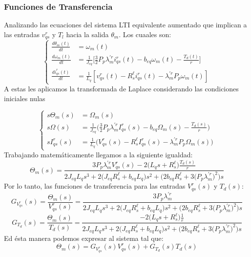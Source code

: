 \documentclass[blue,fullpaper]{ludusofficial}  %
\begin{document}
\subsubsection{Funciones de Transferencia}
Analizando las ecuaciones del sistema LTI equivalente aumentado que implican a las entradas $v^r_{qs}$ y $T_l$ hacia la salida $\theta_m$. Los cuaales son:
\begin{equation}
\left\{
\begin{aligned}
\frac{d\theta_m(t)}{dt} &= \omega_m(t) \\[1.5ex]
\frac{d\omega_{m}(t)}{dt} &= \frac{1}{J_{eq}} \Bigg[ \frac{3}{2}P_{p} \lambda_{m}^{'r} i_{qs}^{r}(t) - b_{eq} \omega_{m}(t) - \frac{T_d(t)}{r} \Bigg]  \\[1.5ex]
\frac{di_{qs}^{r}(t)}{dt}  &= \frac{1}{L_{q} } \left[ v_{qs}^{r}(t) - R_{s}^{\ell} i_{qs}^{r}(t) - \lambda_{m}^{'r}P_{p} \omega_{m}(t) \right]
\end{aligned}
\right.
\end{equation}
A estas les aplicamos la transformada de Laplace considerando las condiciones iniciales nulas


\begin{equation}
\left\{
\begin{aligned}
s\Theta_m(s) &= \Omega_m(s)\\
s\Omega(s) &= \frac{1}{J_{eq}}\Big(\frac{3}{2}P_p\lambda^{'r}_mI^r_{qs}(s)-b_{eq}\Omega_m(s)-\frac{T_d(s)}{r}\Big)\\
sI^r_{qs}(s) &= \frac{1}{L_q}\Big(V^r_{qs}(s)-R^\ell_{s}I^r_{qs}(s)-\lambda^{'r}_mP_p\Omega_m(s)\Big)
\end{aligned}
\right.
\end{equation}
Trabajando matemáticamente llegamos a la siguiente igualdad:
\begin{equation}
    \Theta_m(s) = \frac{3P_p\lambda_m^{'r}V_{qs}^r(s)-2\Big(L_qs+R^\ell_s\Big)\frac{T_d(s)}{r}}{2J_{eq}L_qs^3+2\Big(J_{eq}R_s^\ell+b_{eq}L_q\Big)s^2+\Big(2b_{eq}R_s^\ell+3\Big(P_p\lambda^{'r}_m\Big)^2\Big)s}
\end{equation}
Por lo tanto, las funciones de transferencia para las entradas $V^r_{qs}(s)$ y $T_d(s)$:
\begin{equation}
    G_{V^r_{qs}}(s)=\frac{\Theta_m(s)}{V_{qs}^r(s)} = \frac{3P_p\lambda_m^{'r}}{2J_{eq}L_qs^3+2\Big(J_{eq}R_s^\ell+b_{eq}L_q\Big)s^2+\Big(2b_{eq}R_s^\ell+3\Big(P_p\lambda^{'r}_m\Big)^2\Big)s}    
\end{equation}
\begin{equation}
    G_{T_d}(s)=\frac{\Theta_m(s)}{T_d(s)}= \frac{-2\Big(L_qs+R^\ell_s\Big)\frac{1}{r}}{2J_{eq}L_qs^3+2\Big(J_{eq}R_s^\ell+b_{eq}L_q\Big)s^2+\Big(2b_{eq}R_s^\ell+3\Big(P_p\lambda^{'r}_m\Big)^2\Big)s}
\end{equation}
Ed ésta manera podemos expresar al sistema tal que: 
\begin{equation}
    \Theta_m(s)=G_{V^r_{qs}}(s)V^r_{qs}(s)+G_{T_d}(s)T_d(s)
\end{equation}
\end{document}
